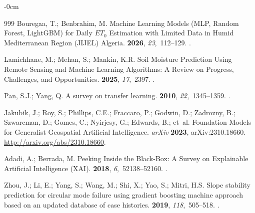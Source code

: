 \documentclass[land,review,accept,pdftex,oneauthor]{Definitions/mdpi}
\begin{document}
\begin{adjustwidth}{-\extralength}{0cm}
\begin{thebibliography}{999}
Bouregaa, T.; Benbrahim, M.
\newblock Machine Learning Models (MLP, Random Forest, LightGBM) for Daily
  $ET_0$ Estimation with Limited Data in Humid Mediterranean Region (JIJEL)
  Algeria.
 {\bf 2026}, {\em 23},~112--129.
.

Lamichhane, M.; Mehan, S.; Mankin, K.R.
\newblock Soil Moisture Prediction Using Remote Sensing and Machine Learning
  Algorithms: A Review on Progress, Challenges, and Opportunities.
 {\bf 2025}, {\em 17},~2397.
.

Pan, S.J.; Yang, Q.
\newblock A survey on transfer learning.
 {\bf 2010},
  {\em 22},~1345--1359.
.

Jakubik, J.; Roy, S.; Phillips, C.E.; Fraccaro, P.; Godwin, D.; Zadrozny, B.;
  Szwarcman, D.; Gomes, C.; Nyirjesy, G.; Edwards, B.;  et~al.
\newblock Foundation Models for Generalist Geospatial Artificial Intelligence. \emph{arXiv} 
\textbf{2023},  arXiv:2310.18660.  \url{http://arxiv.org/abs/2310.18660}.

Adadi, A.; Berrada, M.
\newblock Peeking Inside the Black-Box: A Survey on Explainable Artificial
  Intelligence ({XAI}).
 {\bf 2018}, {\em 6},~52138--52160.
.

Zhou, J.; Li, E.; Yang, S.; Wang, M.; Shi, X.; Yao, S.; Mitri, H.S.
\newblock Slope stability prediction for circular mode failure using gradient
  boosting machine approach based on an updated database of case histories.
 {\bf 2019}, {\em 118},~505--518.
.


\end{thebibliography}
\end{adjustwidth}
\end{document}
